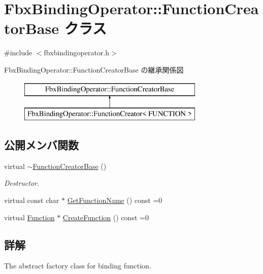 \hypertarget{class_fbx_binding_operator_1_1_function_creator_base}{}\section{Fbx\+Binding\+Operator\+:\+:Function\+Creator\+Base クラス}
\label{class_fbx_binding_operator_1_1_function_creator_base}


{\ttfamily \#include $<$fbxbindingoperator.\+h$>$}

Fbx\+Binding\+Operator\+:\+:Function\+Creator\+Base の継承関係図\begin{figure}[H]
\begin{center}
\leavevmode
\includegraphics[height=2.000000cm]{class_fbx_binding_operator_1_1_function_creator_base}
\end{center}
\end{figure}
\subsection*{公開メンバ関数}
\begin{DoxyCompactItemize}
\item 
virtual \hyperlink{class_fbx_binding_operator_1_1_function_creator_base_af1836555f0af15087801bcd0ca25e977}{$\sim$\+Function\+Creator\+Base} ()
\begin{DoxyCompactList}\small\item\em Destructor. \end{DoxyCompactList}\item 
virtual const char $\ast$ \hyperlink{class_fbx_binding_operator_1_1_function_creator_base_a7a5ec0f9c376ce88b12cbfe171498913}{Get\+Function\+Name} () const =0
\item 
virtual \hyperlink{class_fbx_binding_operator_1_1_function}{Function} $\ast$ \hyperlink{class_fbx_binding_operator_1_1_function_creator_base_a092cb78156b31c356d929c3cfa9ff077}{Create\+Function} () const =0
\end{DoxyCompactItemize}


\subsection{詳解}
The abstract factory class for binding function. 

